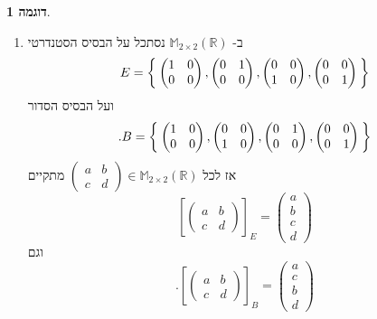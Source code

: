 \documentclass[12pt]{report}
\theoremstyle{plain}
\theoremstyle{definition}
\newtheorem{example}{דוגמה}[chapter]
\newcommand{\R}{\mathbb{R}}
\newcommand{\M}{\mathbb{M}}
\newcommand{\0}{\mathbf{0}}
\begin{document}
\begin{example}
\begin{enumerate}[label=\alph*.]
\item 
ב-
$\M_{2\times 2}(\R)$
נסתכל על הבסיס הסטנדרטי
$$
E=\Set{\begin{pmatrix}
    1 & 0 \\
    0 & 0
    \end{pmatrix},\begin{pmatrix}
    0 & 1 \\
    0 & 0
    \end{pmatrix},\begin{pmatrix}
    0 & 0 \\
    1 & 0
    \end{pmatrix},\begin{pmatrix}
    0 & 0 \\
    0 & 1
    \end{pmatrix}}
$$
ועל הבסיס הסדור
$$
.B=\Set{\begin{pmatrix}
    1 & 0 \\
    0 & 0
    \end{pmatrix},\begin{pmatrix}
    0 & 0 \\
    1 & 0
    \end{pmatrix},\begin{pmatrix}
    0 & 1 \\
    0 & 0
    \end{pmatrix},\begin{pmatrix}
    0 & 0 \\
    0 & 1
    \end{pmatrix}}
$$
אז לכל
$\begin{pmatrix}
a & b \\
c & d
\end{pmatrix}\in\M_{2\times 2}(\R)$
מתקיים
$$
\left[\begin{pmatrix}
a & b \\
c & d
\end{pmatrix}\right]_E=\begin{pmatrix}
a \\
b \\ 
c \\
d
\end{pmatrix}
$$
וגם
$$
.\left[\begin{pmatrix}
a & b \\
c & d
\end{pmatrix}\right]_B=\begin{pmatrix}
a \\
c \\ 
b \\
d
\end{pmatrix}
$$
\end{enumerate}
\end{example}
\end{document}
